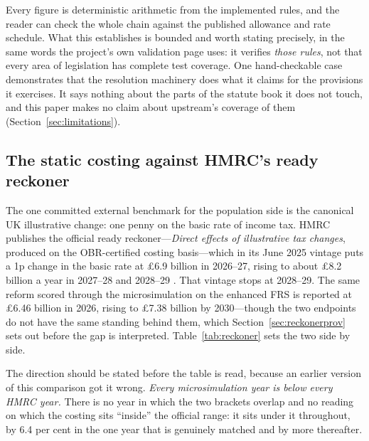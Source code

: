Every figure is deterministic arithmetic from the implemented rules, and the reader can check the whole chain against the published allowance and rate schedule. What this establishes is bounded and worth stating precisely, in the same words the project's own validation page uses: it verifies \emph{those rules}, not that every area of legislation has complete test coverage. One hand-checkable case demonstrates that the resolution machinery does what it claims for the provisions it exercises. It says nothing about the parts of the statute book it does not touch, and this paper makes no claim about upstream's coverage of them (Section~\ref{sec:limitations}).

\subsection{The static costing against HMRC's ready reckoner}
\label{sec:reckoner}

The one committed external benchmark for the population side is the canonical UK illustrative change: one penny on the basic rate of income tax. HMRC publishes the official ready reckoner---\emph{Direct effects of illustrative tax changes}, produced on the OBR-certified costing basis---which in its June 2025 vintage puts a 1p change in the basic rate at \pounds 6.9 billion in 2026--27, rising to about \pounds 8.2 billion a year in 2027--28 and 2028--29 \citep{hmrc2025reckoner}. That vintage stops at 2028--29. The same reform scored through the microsimulation on the enhanced FRS is reported at \pounds 6.46 billion in 2026, rising to \pounds 7.38 billion by 2030---though the two endpoints do not have the same standing behind them, which Section~\ref{sec:reckonerprov} sets out before the gap is interpreted. Table~\ref{tab:reckoner} sets the two side by side.

The direction should be stated before the table is read, because an earlier version of this comparison got it wrong. \emph{Every microsimulation year is below every HMRC year.} There is no year in which the two brackets overlap and no reading on which the costing sits ``inside'' the official range: it sits under it throughout, by 6.4 per cent in the one year that is genuinely matched and by more thereafter.


